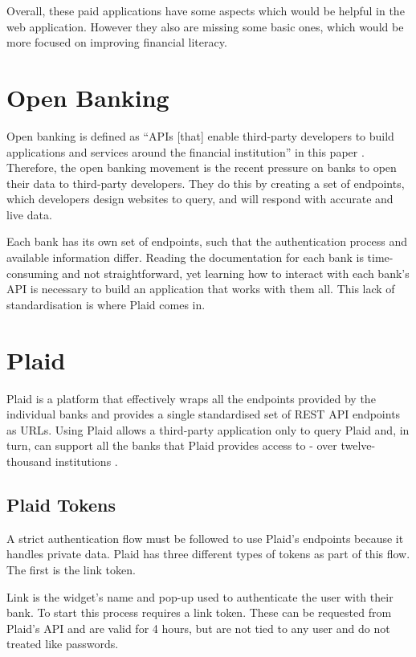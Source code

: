 Overall, these paid applications have some aspects which would be helpful in the web application. However they also are missing some basic ones, which would be more focused on improving financial literacy.

\section{Open Banking}
\label{sec:open-banking}
Open banking is defined as ``APIs [that] enable third-party developers to build applications and services around the financial institution'' in this paper \cite{OpenBankingDefinition}. Therefore, the open banking movement is the recent pressure on banks to open their data to third-party developers. They do this by creating a set of endpoints, which developers design websites to query, and will respond with accurate and live data.

Each bank has its own set of endpoints, such that the authentication process and available information differ. Reading the documentation for each bank is time-consuming and not straightforward, yet learning how to interact with each bank's API is necessary to build an application that works with them all. This lack of standardisation is where Plaid \cite{Plaid} comes in.

\section{Plaid}
\label{sec:plaid}
Plaid is a platform that effectively wraps all the endpoints provided by the individual banks and provides a single standardised set of REST API endpoints as URLs. Using Plaid allows a third-party application only to query Plaid and, in turn, can support all the banks that Plaid provides access to - over twelve-thousand institutions \cite{PlaidInstitutions}.

\subsection{Plaid Tokens}
A strict authentication flow must be followed to use Plaid's endpoints because it handles private data. Plaid has three different types of tokens as part of this flow. The first is the link token.

Link is the widget's name and pop-up used to authenticate the user with their bank. To start this process requires a link token. These can be requested from Plaid's API and are valid for 4 hours, but are not tied to any user and do not treated like passwords.

